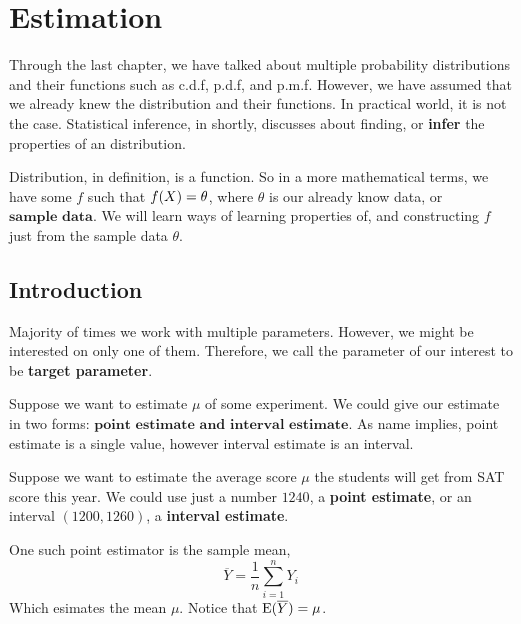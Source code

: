 \chapter{Estimation}
Through the last chapter, we have talked about multiple probability distributions and their functions such as c.d.f, p.d.f, and p.m.f. 
However, we have assumed that we already knew the distribution and their functions. In practical world, it is not the case.
Statistical inference, in shortly, discusses about finding, or \textbf{infer} the properties of an distribution.

Distribution, in definition, is a function. So in a more mathematical terms, we have some $f$ such that $f(X)= \operatorname{\theta}$, where $\theta$ is our already know data, or $\textbf{sample data}$. We will learn ways of learning properties of, and constructing $f$ just from the sample data $\theta$.

\section{Introduction}
Majority of times we work with multiple parameters. However, we might be interested on only one of them. Therefore,  we call the parameter of our interest to be \textbf{target parameter}.
\par
    Suppose we want to estimate $\mu$ of some experiment. We could give our estimate in two forms: $\textbf{point estimate and interval estimate}$. As name implies, point estimate is a single value, however interval estimate is an interval.
\begin{example}
    Suppose we want to estimate the average score  $\mu$ the students will get from SAT score this year. We could use just a number $1240$, a \textbf{point estimate}, or an interval $(1200,1260)$, a \textbf{interval estimate}.
\end{example}

One such point estimator is  the sample mean,
\[\overline{Y} = \frac{1}{n}\sum_{i=1}^nY_i\]
Which esimates the mean $\mu$. Notice that ${\operatorname{E}}(\overline{Y}) = \mu$. 
